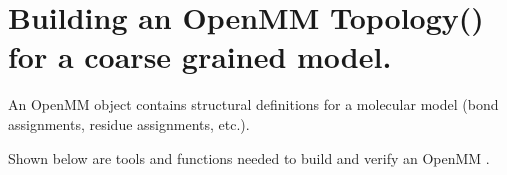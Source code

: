 \documentclass[letterpaper,12pt,english,openany,oneside]{sphinxmanual}
\begin{document}
\section{Building an OpenMM Topology() for a coarse grained model.}
\label{\detokenize{build:building-an-openmm-topology-for-a-coarse-grained-model}}
An OpenMM  object contains structural definitions for a molecular model (bond assignments, residue assignments, etc.).

Shown below are tools and functions needed to build and verify an OpenMM  .

\label{\detokenize{build:module-build.cg_build}}
\end{document}

